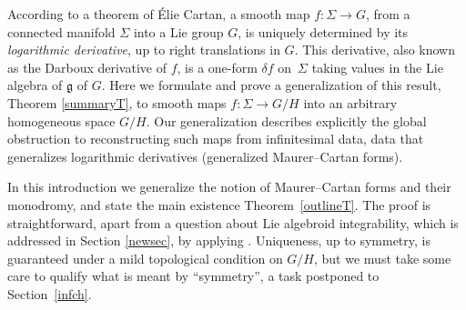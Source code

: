 According to a theorem of \'Elie Cartan, a smooth map $f \colon \Sigma \rightarrow G$, from a
connected manifold $\Sigma$ into a Lie group $G$, is uniquely
determined by its {\it logarithmic derivative}, up to right
translations in $G$. This derivative, also known as the Darboux
derivative of $f$, is a one-form $\delta f$ on~$\Sigma $ taking values
in the Lie algebra of ${\mathfrak g} $ of $G$. Here we formulate and
prove a generalization of this result, Theorem \ref{summaryT}, to
smooth maps $f \colon \Sigma \rightarrow G/H$ into an arbitrary
homogeneous space $G/H$. Our generalization describes explicitly the
global obstruction to reconstructing such maps from infinitesimal
data, data that generalizes logarithmic derivatives (generalized
Maurer--Cartan forms).

In this introduction we generalize the notion of Maurer--Cartan forms
and their monodromy, and state the main existence Theorem~\ref{outlineT}. The proof is straightforward, apart from a question
about Lie algebroid integrability, which is addressed in Section
\ref{newsec}, by applying \cite{Crainic_Fernandes_03}. Uniqueness, up
to symmetry, is guaranteed under a mild topological condition on
$G/H$, but we must take some care to qualify what is meant by
``symmetry'', a task postponed to Section~\ref{infch}.
